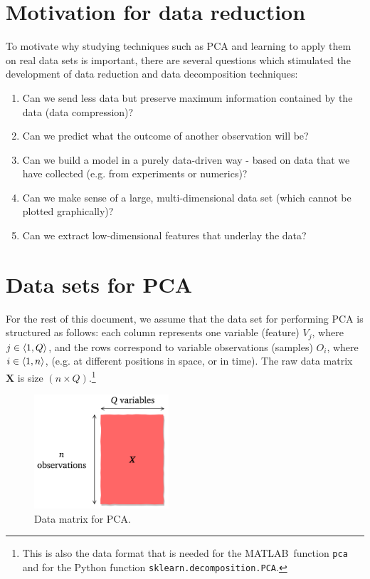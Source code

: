 \documentclass[10pt,twocolumn]{article}
\begin{document}
\section{Motivation for data reduction}

To motivate why studying techniques such as PCA and learning to apply them on real data sets is important, there are several questions which stimulated the development of data reduction and data decomposition techniques:

\begin{enumerate}
\item Can we send less data but preserve maximum information contained by the data (data compression)?

\item Can we predict what the outcome of another observation will be?

\item Can we build a model in a purely data-driven way - based on data that we have collected (e.g. from experiments or numerics)?

\item Can we make sense of a large, multi-dimensional data set (which cannot be plotted graphically)?

\item Can we extract low-dimensional features that underlay the data?
\end{enumerate}

\section{Data sets for PCA}

For the rest of this document, we assume that the data set for performing PCA is structured as follows: each column represents one variable (feature) $V_j$, where $j \in \braket{1, Q}$, and the rows correspond to variable observations (samples) $O_i$, where $i \in \braket{1, n}$, (e.g. at different positions in space, or in time). The raw data matrix $\bm{X}$ is size $(n \times Q)$.\footnote{This is also the data format that is needed for the MATLAB\textregistered \, function \texttt{pca} and for the Python function \texttt{sklearn.decomposition.PCA}.}



\begin{figure}[H]
\centering\includegraphics[width=5cm]{data-set-PCA.png}
\caption{Data matrix for PCA.}
\label{fig:data-matrix}
\end{figure}
\end{document}
